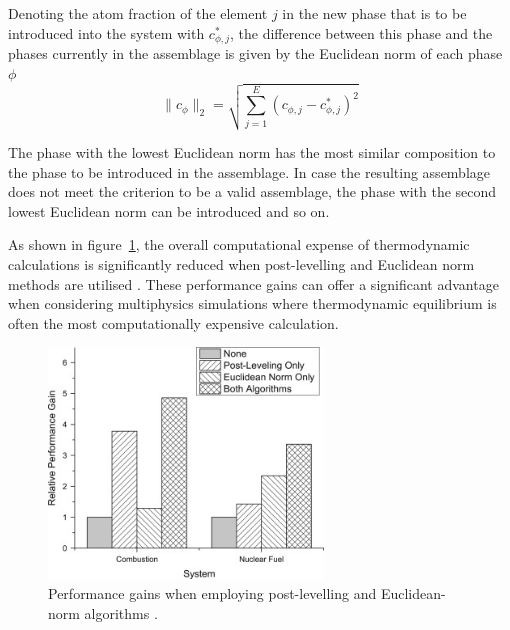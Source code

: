 	Denoting the atom fraction of the element $j$ in the new phase that is to be introduced into the system with $c_{\phi,j}^{*}$, the difference between this phase and the phases currently in the assemblage is given by the Euclidean norm of each phase $\phi$
	\begin{equation}
		\|c_\phi\|_2 = \sqrt{\sum_{j=1}^{E} \left(c_{\phi,j} - c_{\phi,j}^{*}\right)^2}
	\end{equation}

	The phase with the lowest Euclidean norm has the most similar composition to the phase to be introduced in the assemblage. In case the resulting assemblage does not meet the criterion to be a valid assemblage, the phase with the second lowest Euclidean norm can be introduced and so on.

	As shown in figure~\ref{fig:PEA_gains}, the overall computational expense of thermodynamic calculations is significantly reduced when post-levelling and Euclidean norm methods are utilised \cite{Piro12a}. These performance gains can offer a significant advantage when considering multiphysics simulations where thermodynamic equilibrium is often the most computationally expensive calculation.

	\begin{figure}[htbp]
		\centering
		\includegraphics[width=0.65\textwidth]{figures/PEA_Gains}
		\caption{Performance gains when employing post-levelling and Euclidean-norm algorithms \cite{Piro12a}.}
		\label{fig:PEA_gains}
	\end{figure}


